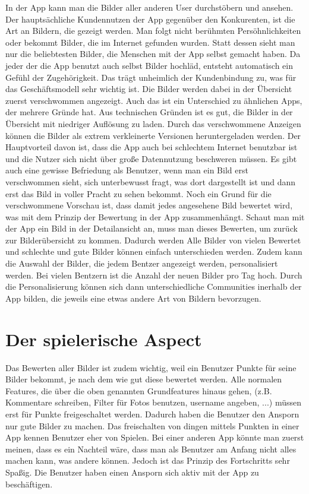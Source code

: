 In der App kann man die Bilder aller anderen User durchstöbern und ansehen. Der hauptsächliche Kundennutzen der App gegenüber den Konkurenten, ist die Art an Bildern, die gezeigt werden. Man folgt nicht berühmten Persöhnlichkeiten oder bekommt Bilder, die im Internet gefunden wurden. Statt dessen sieht man nur die beliebtesten Bilder, die Menschen mit der App selbst gemacht haben. Da jeder der die App benutzt auch selbst Bilder hochläd, entsteht automatisch ein Gefühl der Zugehörigkeit. Das trägt unheimlich der Kundenbindung zu, was für das Geschäftsmodell sehr wichtig ist.
Die Bilder werden dabei in der Übersicht zuerst verschwommen angezeigt. Auch das ist ein Unterschied zu ähnlichen Apps, der mehrere Gründe hat. Aus technischen Gründen ist es gut, die Bilder in der Übersicht mit niedriger Auflösung zu laden. Durch das verschwommene Anzeigen können die Bilder als extrem verkleinerte Versionen heruntergeladen werden. Der Hauptvorteil davon ist, dass die App auch bei schlechtem Internet benutzbar ist und die Nutzer sich nicht über große Datennutzung beschweren müssen. Es gibt auch eine gewisse Befriedung als Benutzer, wenn man ein Bild erst verschwommen sieht, sich unterbewusst fragt, was dort dargestellt ist und dann erst das Bild in voller Pracht zu sehen bekommt. Noch ein Grund für die verschwommene Vorschau ist, dass damit jedes angesehene Bild bewertet wird, was mit dem Prinzip der Bewertung in der App zusammenhängt.
Schaut man mit der App ein Bild in der Detailansicht an, muss man dieses Bewerten, um zurück zur Bilderübersicht zu kommen. Dadurch werden Alle Bilder von vielen Bewertet und schlechte und gute Bilder können einfach unterschieden werden. Zudem kann die Auswahl der Bilder, die jedem Bentzer angezeigt werden, personalisiert werden. Bei vielen Bentzern ist die Anzahl der neuen Bilder pro Tag hoch. Durch die Personalisierung können sich dann unterschiedliche Communities inerhalb der App bilden, die jeweils eine etwas andere Art von Bildern bevorzugen.

\section{Der spielerische Aspect}

Das Bewerten aller Bilder ist zudem wichtig, weil ein Benutzer Punkte für seine Bilder bekommt, je nach dem wie gut diese bewertet werden. Alle normalen Features, die über die oben genannten Grundfeatures hinaus gehen, (z.B. Kommentare schreiben, Filter für Fotos benutzen, username angeben, ...) müssen erst für Punkte freigeschaltet werden. Dadurch haben die Benutzer den Ansporn nur gute Bilder zu machen.
Das freischalten von dingen mittels Punkten in einer App kennen Benutzer eher von Spielen. Bei einer anderen App könnte man zuerst meinen, dass es ein Nachteil wäre, dass man als Benutzer am Anfang nicht alles machen kann, was andere können. Jedoch ist das Prinzip des Fortschritts sehr Spaßig. Die Benutzer haben einen Ansporn sich aktiv mit der App zu beschäftigen.

